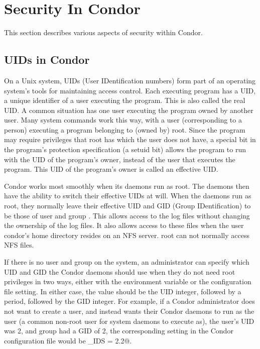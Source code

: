 \section{\label{sec:Security}Security In Condor}

This section describes various aspects of security within Condor.

\subsection{\label{sec:uids}UIDs in Condor}


On a Unix system,
UIDs (User IDentification numbers) form part of an operating system's
tools for maintaining access control.
Each executing program has a UID,
a unique identifier of a user executing the program.
This is also called the real UID.
A common situation has one user executing the program owned
by another user.
Many system commands work this way, with a user (corresponding
to a person) executing a program belonging to (owned by) root.
Since the program may require privileges that root has which
the user does not have, a special bit in the program's
protection specification (a setuid bit) allows the program
to run with the UID of the program's owner, instead of the
user that executes the program.
This UID of the program's owner is called an effective UID.

Condor works most smoothly when its daemons run as root.
The daemons then have the ability to switch their 
effective UIDs at will.
When the daemons run as root,
they normally leave their effective UID and GID (Group IDentification)
to be those of user and group \verb@condor@.
This allows access to the log files without
changing the ownership of the log files.
It also allows access to these files when
the user condor's home directory resides on an NFS server.
root can not normally access NFS files.

If there is no \verb@condor@ user and group on the system, an
administrator can specify which UID and GID the Condor daemons should
use when they do not need root privileges in two ways, 
either with the  environment variable or the
 configuration file setting.
In either case, the value should be the UID integer, followed by a
period, followed by the GID integer.
For example, if a Condor administrator does not want to create a
\verb@condor@ user, and instead wants their Condor daemons to run as
the \verb@daemon@ user (a common non-root user for system daemons to
execute as), the \verb@daemon@ user's UID was 2, and group
\verb@daemon@ had a GID of 2, the corresponding setting in the Condor
configuration file would be \verb@CONDOR_IDS = 2.2@.

